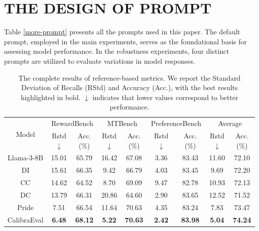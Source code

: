 \documentclass[sigconf]{acmart}
\begin{document}
\section{THE DESIGN OF PROMPT}
\label{prompt}

Table \ref{more-prompt} presents all the prompts used in this paper. The default prompt, employed in the main experiments, serves as the foundational basis for assessing model performance. In the robustness experiments, four distinct prompts are utilized to evaluate variations in model responses.


\begin{table}[t]
\vspace{-3mm}
\caption{
The complete results of reference-based metrics. We report the Standard Deviation of Recalls (RStd) and Accuracy (Acc.), with the best results highlighted in bold. $\downarrow$ indicates that lower values correspond to better performance.}
\vspace{-3mm}
\begin{tabular}{c|cc|cc|cc|cc}
\hline
\multirow{2}{*}{Model} & \multicolumn{2}{c|}{RewardBench} & \multicolumn{2}{c|}{MTBench}   & \multicolumn{2}{c|}{PreferenceBench} & \multicolumn{2}{c}{Average}    \\
                       & Rstd $\downarrow$           & Acc.(\%)       & Rstd$\downarrow$          & Acc.(\%)       & Rstd $\downarrow$            & Acc.(\%)          & Rstd $\downarrow$          & Acc.(\%)       \\ \hline
Llama-3-8B             & 15.01           & 65.79          & 16.42         & 67.08          & 3.36              & 83.43             & 11.60         & 72.10          \\
DI                     & 15.61           & 66.35          & 9.42          & 66.79          & 4.03              & 83.45             & 9.69          & 72.20          \\
CC                     & 14.62           & 64.52          & 8.70          & 69.09          & 9.47              & 82.78             & 10.93         & 72.13          \\
DC                     & 13.79           & 66.31          & 20.86         & 64.60          & 2.90              & 83.65             & 12.52         & 71.52          \\
Pride                  & 7.51            & 66.54          & 11.64         & 70.63          & 4.35              & 83.24             & 7.83          & 73.47          \\
CalibraEval            & \textbf{6.48}   & \textbf{68.12} & \textbf{5.22} & \textbf{70.63} & \textbf{2.42}     & \textbf{83.98}    & \textbf{5.04} & \textbf{74.24} \\ \hline

\end{tabular}
\end{table}
\end{document}
